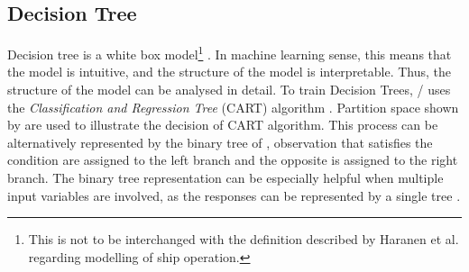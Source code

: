 \subsection{Decision Tree}\label{sec:dt_theo}

Decision tree is a white box model\footnote{This is not to be interchanged with the definition described by Haranen et al. \citep{MichaelHaranen.2016} regarding modelling of ship operation.} \citep{Geron.2019}. In machine learning sense, this means that the model is intuitive, and the structure of the model is interpretable. Thus, the structure of the model can be analysed in detail. To train Decision Trees, \scikit/ \citep{FabianPedregosa.2011} uses the \emph{Classification and Regression Tree} (CART) algorithm \citep{Breiman.2017}. Partition space shown by  are used to illustrate the decision of CART algorithm. This process can be alternatively represented by the binary tree of , observation that satisfies the condition are assigned to the left branch and the opposite is assigned to the right branch. The binary tree representation can be especially helpful when multiple input variables are involved, as the responses can be represented by a single tree \citep{Hastie.2009}.\\

